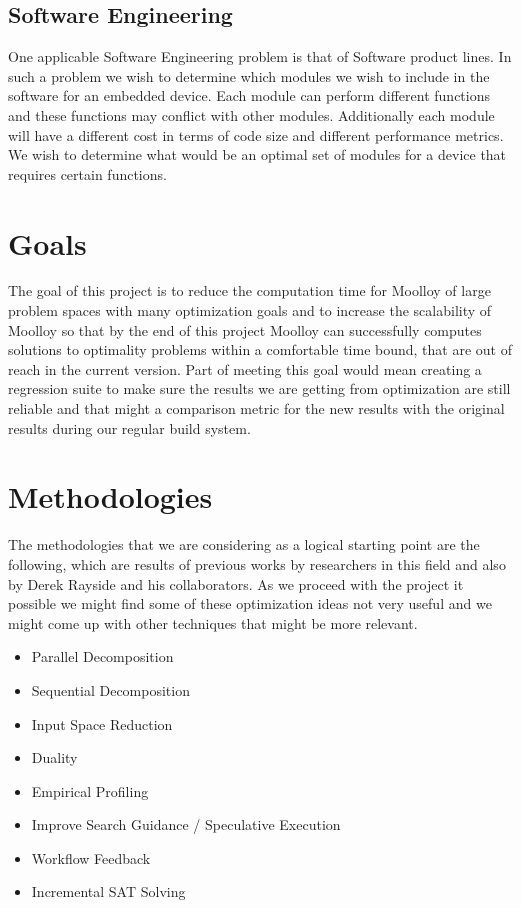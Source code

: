 \documentclass[11pt]{article}
\begin{document}
\subsection{Software Engineering}
One applicable Software Engineering problem is that of Software product
lines. In such a problem we wish to determine which modules we wish to
include in the software for an embedded device. Each module can perform
different functions and these functions may conflict with other
modules. Additionally each module will have a different cost in terms
of code size and different performance metrics. We wish to determine
what would be an optimal set of modules for a device that requires
certain functions.

\section{Goals}
The goal of this project is to reduce the computation time for Moolloy
of large problem spaces with many optimization goals and to increase
the scalability of Moolloy so that by the end of this project Moolloy
can successfully computes solutions to optimality problems within a
comfortable time bound, that are out of reach in the current version.
Part of meeting this goal would mean creating a regression suite to
make sure the results we are getting from optimization are still
reliable and that might a comparison metric for the new results with
the original results during our regular build system.

\section{Methodologies}
The methodologies that we are considering as a logical starting point
are the following, which are results of previous works by researchers
in this field and also by Derek Rayside and his collaborators. As we
proceed with the project it possible we might find some of these
optimization ideas not very useful and we might come up with other
techniques that might be more relevant.

\begin{itemize}
  \item Parallel Decomposition
  \item Sequential Decomposition
  \item Input Space Reduction
  \item Duality
  \item Empirical Profiling
  \item Improve Search Guidance / Speculative Execution
  \item Workflow Feedback
  \item Incremental SAT Solving
\end{itemize}
\end{document}
